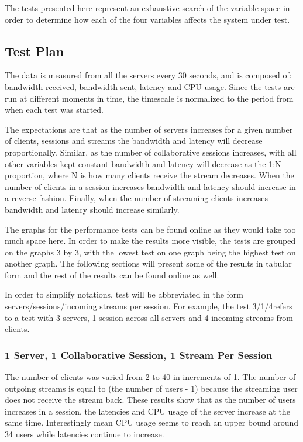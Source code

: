 The tests presented here represent an exhaustive search of the variable space in order to determine how each of the four variables affects the system under test.

\subsection{Test Plan}

The data is measured from all the servers every 30 seconds, and is composed of: bandwidth received, bandwidth sent, latency and CPU usage. Since the tests are run at different moments in time, the timescale is normalized to the period from when each test was started.

The expectations are that as the number of servers increases for a given number of clients, sessions and streams the bandwidth and latency will decrease proportionally. Similar, as the number of collaborative sessions increases, with all other variables kept constant bandwidth and latency will decrease as the 1:N proportion, where N is how many clients receive the stream decreases. When the number of clients in a session increases bandwidth and latency should increase in a reverse fashion. Finally, when the number of streaming clients increases bandwidth and latency should increase similarly.

The graphs for the performance tests can be found online as they would take too much space here. In order to make the results more visible, the tests are grouped on the graphs 3 by 3, with the lowest test on one graph being the highest test on another graph. The following sections will present some of the results in tabular form and the rest of the results can be found online as well.

In order to simplify notations, test will be abbreviated in the form servers/sessions/incoming streams per session. For example, the test 3/1/4refers to a test with 3 servers, 1 session across all servers and 4 incoming streams from clients.

\subsubsection{1 Server, 1 Collaborative Session, 1 Stream Per Session}
\label{sec:1serv_1sess_1str}

The number of clients was varied from 2 to 40 in increments of 1. The number of outgoing streams is equal to (the number of users - 1) because the streaming user does not receive the stream back. These results show that as the number of users increases in a session, the latencies and CPU usage of the server increase at the same time. Interestingly mean CPU usage seems to reach an upper bound around 34 users while latencies continue to increase.

